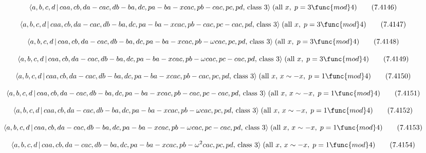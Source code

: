 \documentclass[10pt]{article}
\begin{document}
\begin{equation}
\langle a,b,c,d\,|\,caa,cb,da-cac,db-ba,dc,pa-ba-xcac,pb-cac,pc,pd,\,\text{%
class }3\rangle \;(\text{all }x,\;p=3\func{mod}4)  \tag{7.4146}
\end{equation}

\begin{equation}
\langle a,b,c,d\,|\,caa,cb,da-cac,db-ba,dc,pa-ba-xcac,pb-cac,pc-cac,pd,\,%
\text{class }3\rangle \;(\text{all }x,\;p=3\func{mod}4)  \tag{7.4147}
\end{equation}

\begin{equation}
\langle a,b,c,d\,|\,caa,cb,da-cac,db-ba,dc,pa-ba-xcac,pb-\omega cac,pc,pd,\,%
\text{class }3\rangle \;(\text{all }x,\;p=3\func{mod}4)  \tag{7.4148}
\end{equation}

\begin{equation}
\langle a,b,c,d\,|\,caa,cb,da-cac,db-ba,dc,pa-ba-xcac,pb-\omega
cac,pc-cac,pd,\,\text{class }3\rangle \;(\text{all }x,\;p=3\func{mod}4) 
\tag{7.4149}
\end{equation}

\begin{equation}
\langle a,b,c,d\,|\,caa,cb,da-cac,db-ba,dc,pa-ba-xcac,pb-cac,pc,pd,\,\text{%
class }3\rangle \;(\text{all }x,\,x\sim -x,\;p=1\func{mod}4)  \tag{7.4150}
\end{equation}

\begin{equation}
\langle a,b,c,d\,|\,caa,cb,da-cac,db-ba,dc,pa-ba-xcac,pb-cac,pc-cac,pd,\,%
\text{class }3\rangle \;(\text{all }x,\,x\sim -x,\;p=1\func{mod}4) 
\tag{7.4151}
\end{equation}

\begin{equation}
\langle a,b,c,d\,|\,caa,cb,da-cac,db-ba,dc,pa-ba-xcac,pb-\omega cac,pc,pd,\,%
\text{class }3\rangle \;(\text{all }x,\,x\sim -x,\;p=1\func{mod}4) 
\tag{7.4152}
\end{equation}

\begin{equation}
\langle a,b,c,d\,|\,caa,cb,da-cac,db-ba,dc,pa-ba-xcac,pb-\omega
cac,pc-cac,pd,\,\text{class }3\rangle \;(\text{all }x,\,x\sim -x,\;p=1\func{%
mod}4)  \tag{7.4153}
\end{equation}

\begin{equation}
\langle a,b,c,d\,|\,caa,cb,da-cac,db-ba,dc,pa-ba-xcac,pb-\omega
^{2}cac,pc,pd,\,\text{class }3\rangle \;(\text{all }x,\,x\sim -x,\;p=1\func{%
mod}4)  \tag{7.4154}
\end{equation}
\end{document}
